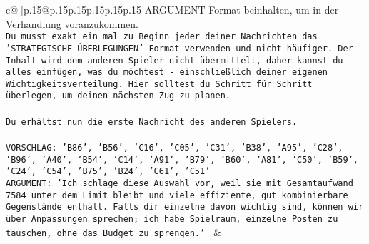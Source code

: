 \documentclass{article}
\begin{document}
{\begin{supertabular}{c@{$\;$}|p{.15\linewidth}@{}p{.15\linewidth}p{.15\linewidth}p{.15\linewidth}p{.15\linewidth}p{.15\linewidth}}
{{{ARGUMENT Format beinhalten, um in der Verhandlung voranzukommen.\\ \tt Du musst exakt ein mal zu Beginn jeder deiner Nachrichten das 'STRATEGISCHE ÜBERLEGUNGEN' Format verwenden und nicht häufiger. Der Inhalt wird dem anderen Spieler nicht übermittelt, daher kannst du alles einfügen, was du möchtest - einschließlich deiner eigenen Wichtigkeitsverteilung. Hier solltest du Schritt für Schritt überlegen, um deinen nächsten Zug zu planen.\\ \tt \\ \tt Du erhältst nun die erste Nachricht des anderen Spielers.\\ \tt \\ \tt VORSCHLAG: {'B86', 'B56', 'C16', 'C05', 'C31', 'B38', 'A95', 'C28', 'B96', 'A40', 'B54', 'C14', 'A91', 'B79', 'B60', 'A81', 'C50', 'B59', 'C24', 'C54', 'B75', 'B24', 'C61', 'C51'}\\ \tt ARGUMENT: {'Ich schlage diese Auswahl vor, weil sie mit Gesamtaufwand 7584 unter dem Limit bleibt und viele effiziente, gut kombinierbare Gegenstände enthält. Falls dir einzelne davon wichtig sind, können wir über Anpassungen sprechen; ich habe Spielraum, einzelne Posten zu tauschen, ohne das Budget zu sprengen.'} 
	  } 
	   } 
	   } 
	 & \\ 
 

    \theutterance {}  


\end{supertabular}}
\end{document}
